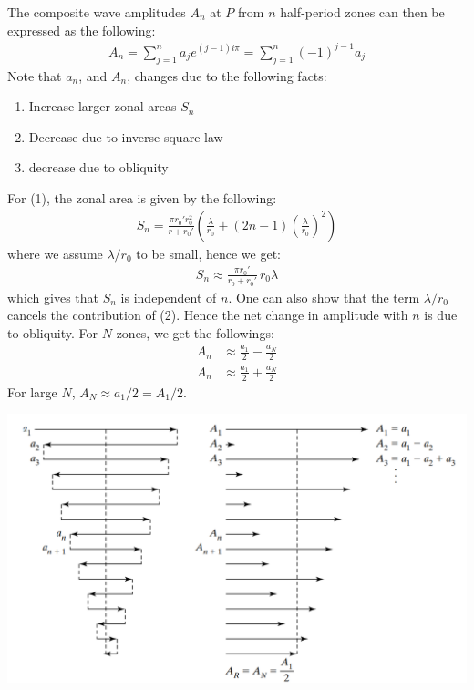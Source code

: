 \documentclass[11pt]{book}
\theoremstyle{break}
\theoremstyle{break}
\begin{document}
The composite wave amplitudes $A_n$ at $P$ from $n$ half-period zones can then be expressed as the following:
\begin{align}
A_n = \sum_{j=1}^n a_je^{(j-1)i\pi} = \sum_{j=1}^n(-1)^{j-1}a_j
\end{align}
Note that $a_n$, and $A_n$, changes due to the following facts:
\begin{enumerate}
\item Increase larger zonal areas $S_n$
\item Decrease due to inverse square law
\item decrease due to obliquity
\end{enumerate}
For (1), the zonal area is given by the following:
\begin{align*}
S_n = \frac{\pi r_0' r_0^2}{r+r_0'} \left( \frac{\lambda}{r_0} + (2n-1) \left(\frac{\lambda}{r_0}\right)^2 \right)
\end{align*}
where we assume $\lambda/r_0$ to be small, hence we get:
\begin{align*}
S_n \approx \frac{\pi r_0'}{r_0 + r_0'}\, r_0 \lambda 
\end{align*}
which gives that $S_n$ is independent of $n$. One can also show that the term $\lambda/r_0$ cancels the contribution of (2). Hence the net change in amplitude with $n$ is due to obliquity. For $N$ zones, we get the followings:
\begin{align*}
A_n &\approx \frac{a_1}{2} - \frac{a_N}{2} \tag{N is even}\\
A_n &\approx \frac{a_1}{2} + \frac{a_N}{2} \tag{N is odd}
\end{align*}
For large $N$, $A_N \approx a_1/2 = A_1/2$. 

\begin{center}
\includegraphics[scale=0.55]{zonesAmp}
\end{center}
\end{document}
